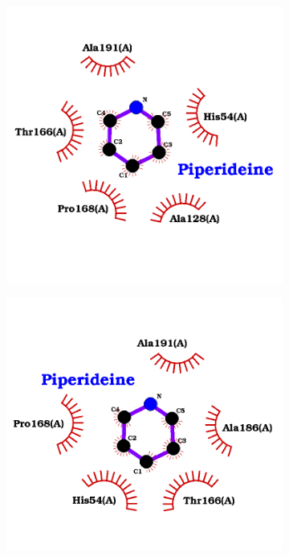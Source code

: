 \documentclass[12pt]{article}
\begin{document}
	\FloatBarrier
	\begin{figure}[h!]
		\centering
		\begin{subfigure}[h!]{0.35\textwidth}
			\hspace{2cm}
			\includegraphics[width=\textwidth]{../10/Dock/Dock2/best.png}
			\caption{}
		\end{subfigure}
		\hfill
		\begin{subfigure}[h!]{0.35\textwidth}
			\hspace{-2cm}
			\includegraphics[width=\textwidth]{../10/Dock/Dock2/best2.png}

\end{subfigure}
\end{figure}
\end{document}
